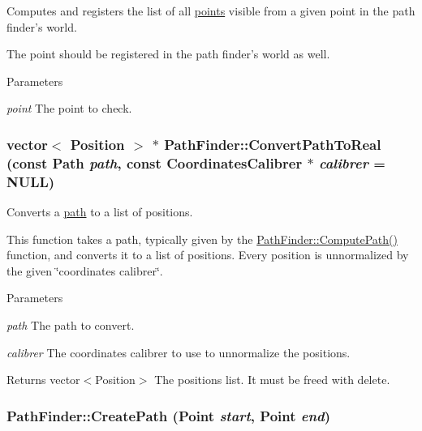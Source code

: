 Computes and registers the list of all \hyperlink{structPathFinder_1_1Point}{points} visible from a given point in the path finder's world. 

The point should be registered in the path finder's world as well.


\begin{DoxyParams}{Parameters}
\item[{\em point}]The point to check. \end{DoxyParams}
\hypertarget{classPathFinder_aba7f833c9bb8de011c62a1f01fb26144}{
\subsubsection[{ConvertPathToReal}]{\setlength{\rightskip}{0pt plus 5cm}vector$<$ Position $>$ $\ast$ PathFinder::ConvertPathToReal (const {\bf Path} {\em path}, \/  const {\bf CoordinatesCalibrer} $\ast$ {\em calibrer} = {\ttfamily NULL})}}
\label{classPathFinder_aba7f833c9bb8de011c62a1f01fb26144}


Converts a \hyperlink{classPathFinder_a269aba09b7b3208092f67f2bc02cf63e}{path} to a list of positions. 

This function takes a path, typically given by the \hyperlink{classPathFinder_a7d1904c4ee6abc79375356dc64cad995}{PathFinder::ComputePath()} function, and converts it to a list of positions. Every position is unnormalized by the given  \char`\"{}coordinates calibrer\char`\"{}.


\begin{DoxyParams}{Parameters}
\item[{\em path}]The path to convert. \item[{\em calibrer}]The coordinates calibrer to use to unnormalize the positions. \end{DoxyParams}
\begin{DoxyReturn}{Returns}
vector$<$Position$>$ The positions list. It must be freed with delete. 
\end{DoxyReturn}
\hypertarget{classPathFinder_a42e557e3fe4cd1b209a4722ecfbf876b}{
\subsubsection[{CreatePath}]{ PathFinder::CreatePath ({\bf Point} {\em start}, \/  {\bf Point} {\em end})}}
\label{classPathFinder_a42e557e3fe4cd1b209a4722ecfbf876b}


